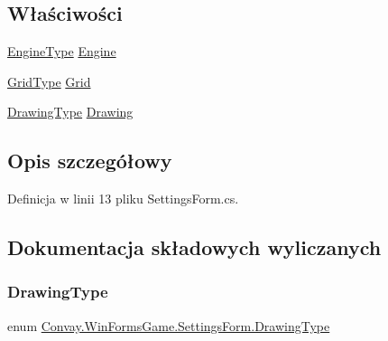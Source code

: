 \subsection*{Właściwości}
\begin{DoxyCompactItemize}
\item 
\hyperlink{class_convay_1_1_win_forms_game_1_1_settings_form_a37834e752cfe1f75738c237dd98d3d45}{Engine\+Type} \hyperlink{class_convay_1_1_win_forms_game_1_1_settings_form_aad52f40495b9d8607969abc2ee58c957}{Engine}
\item 
\hyperlink{class_convay_1_1_win_forms_game_1_1_settings_form_a4226b510bf8cf0a0f4fc5bc2e9c334a6}{Grid\+Type} \hyperlink{class_convay_1_1_win_forms_game_1_1_settings_form_a21206ca71b836cbf292866fc13eb85f4}{Grid}
\item 
\hyperlink{class_convay_1_1_win_forms_game_1_1_settings_form_a7918e2a1b1587472aa065d4db7a13537}{Drawing\+Type} \hyperlink{class_convay_1_1_win_forms_game_1_1_settings_form_a5c69453b0b77e84e7bf2728623404968}{Drawing}
\end{DoxyCompactItemize}


\subsection{Opis szczegółowy}


Definicja w linii 13 pliku Settings\+Form.\+cs.



\subsection{Dokumentacja składowych wyliczanych}
\hypertarget{class_convay_1_1_win_forms_game_1_1_settings_form_a7918e2a1b1587472aa065d4db7a13537}{}\label{class_convay_1_1_win_forms_game_1_1_settings_form_a7918e2a1b1587472aa065d4db7a13537} 
\subsubsection{\texorpdfstring{Drawing\+Type}{DrawingType}}
{\footnotesize\ttfamily enum \hyperlink{class_convay_1_1_win_forms_game_1_1_settings_form_a7918e2a1b1587472aa065d4db7a13537}{Convay.\+Win\+Forms\+Game.\+Settings\+Form.\+Drawing\+Type}\hspace{0.3cm}{\ttfamily [strong]}}


